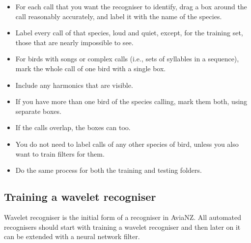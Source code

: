 \documentclass{article}
\begin{document}
\begin{description}
\begin{itemize}
\item For each call that you want the recogniser to identify, drag a box around the call reasonably accurately, and label it with the name of the species.
\item Label every call of that species, loud and quiet, except, for the training set, those that are nearly impossible to see.
\item For birds with songs or complex calls (i.e., sets of syllables in a sequence), mark the whole call of one bird with a single box. 
\item Include any harmonics that are visible. 
\item If you have more than one bird of the species calling, mark them both, using separate boxes. 
\item If the calls overlap, the boxes can too. 
\item You do not need to label calls of any other species of bird, unless you also want to train filters for them. 
\item Do the same process for both the training and testing folders.
\end{itemize}
\end{description}

\subsection{Training a wavelet recogniser}
Wavelet recogniser is the initial form of a recogniser in AviaNZ. All automated recognisers should start with training a wavelet recogniser and then later on it can be extended with a neural network filter.
\end{document}
